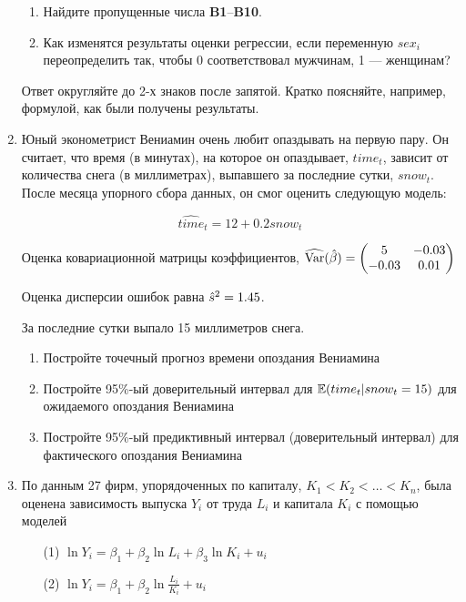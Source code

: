 \documentclass[12pt, a4paper]{article}
\begin{document}
\begin{enumerate}
\begin{enumerate}
\item Найдите пропущенные числа \textbf{B1}--\textbf{B10}.

\item Как изменятся результаты оценки регрессии, если переменную $sex_i$ переопределить так, чтобы 0 соответствовал мужчинам, 1 — женщинам?
\end{enumerate}

Ответ округляйте до 2-х знаков после запятой. Кратко поясняйте, например, формулой, как были получены результаты.



\item Юный эконометрист Вениамин очень любит опаздывать на первую пару. Он считает, что время (в минутах), на которое он опаздывает, $time_t$, зависит от количества снега (в миллиметрах), выпавшего за последние сутки, $snow_t$. После месяца упорного сбора данных, он смог оценить следующую модель:

\[
\widehat{time}_t=12+0.2snow_t
\]

Оценка ковариационной матрицы коэффициентов,
$\widehat{\operatorname{Var}}(\hat{\beta}) = \begin{pmatrix}
5 & -0.03 \\
-0.03 & 0.01\\
\end{pmatrix}$

Оценка дисперсии ошибок равна $\hat{s}^2=1.45$.

За последние сутки выпало 15 миллиметров снега.

\begin{enumerate}
\item Постройте точечный прогноз времени опоздания Вениамина
\item Постройте 95\%-ый доверительный интервал для $\mathbb{E}(time_t |snow_t=15)$ для ожидаемого опоздания Вениамина
\item	Постройте 95\%-ый предиктивный интервал (доверительный интервал) для фактического опоздания Вениамина
\end{enumerate}


\item По данным 27 фирм, упорядоченных по капиталу, $K_1 < K_2 < \ldots < K_n$, была оценена зависимость выпуска $Y_i$ от труда $L_i$ и капитала $K_i$ с помощью моделей

\begin{enumerate}
\item[(1)] $\ln Y_i = \beta_1 + \beta_2 \ln L_i + \beta_3 \ln K_i + u_i$
\item[(2)] $\ln Y_i = \beta_1 + \beta_2 \ln \frac{L_i}{K_i} + u_i$
\end{enumerate}



\end{enumerate}
\end{document}
